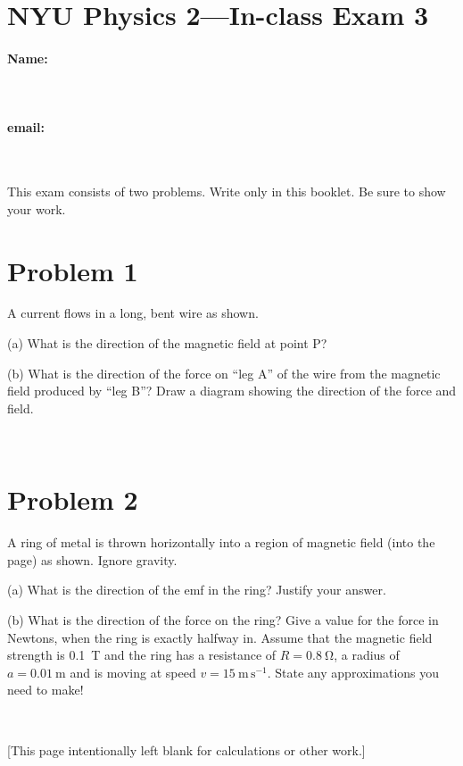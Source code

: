 \documentclass[12pt]{article}
\begin{document}
\section*{NYU Physics 2---In-class Exam 3}

\vfill

\paragraph{Name:} ~
\paragraph{email:} ~

\vfill
\noindent
\resizebox{\textwidth}{!}{}
\vfill

This exam consists of two problems.  Write only in this booklet.  Be
sure to show your work.

\clearpage

\section*{Problem 1}

\vspace{1.5in}

A current flows in a long, bent wire as shown.

(a) What is the direction of the magnetic field at point P?

\vfill

(b) What is the direction of the force on ``leg A'' of the wire
from the magnetic field produced by ``leg B''?  Draw a diagram
showing the direction of the force and field.

\vfill ~

\clearpage

\section*{Problem 2}

\vspace{1.5in}

A ring of metal is thrown horizontally into a region of
magnetic field (into the page) as shown.  Ignore gravity.

(a) What is the direction of the emf in the ring?  Justify your answer.

\vfill

(b) What is the direction of the force on the ring?  Give a value for
the force in Newtons, when the ring is exactly halfway in.  Assume
that the magnetic field strength is 0.1~T and the ring has a
resistance of $R=0.8~\mathrm{\Omega}$, a radius of $a=0.01~\mathrm{m}$
and is moving at speed $v=15~\mathrm{m\,s^{-1}}$.  State any
approximations you need to make!

\vfill ~

\clearpage

[This page intentionally left blank for calculations or other work.]
\end{document}
